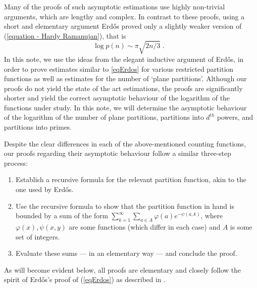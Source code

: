 \documentclass[11pt]{article}
\theoremstyle{plain}
\begin{document}
Many of the proofs of such asymptotic estimations use highly non-trivial arguments, which are lengthy and complex. In contrast to these proofs, using a short and elementary argument Erd\H{o}s \cite{Erdos} proved only a slightly weaker version of (\ref{equation - Hardy Ramanujan}), that is
\begin{equation}\label{eqErdos}
\log p(n) \sim \pi\sqrt{2n/3}\;.
\end{equation}
In this note, we use the ideas from the elegant inductive argument of Erd\H{o}s, in order to prove estimates similar to \eqref{eqErdos} for various restricted partition functions as well as estimates for the number of `plane partitions'.
Although our proofs do not yield the state of the art estimations, the proofs are significantly shorter and yield the correct asymptotic behaviour of the logarithm of the functions under study.
In this note, we will determine the asymptotic behaviour of the logarithm of the number of plane partitions, partitions into $d^{th}$ powers, and partitions into primes.

Despite the clear differences in each of the above-mentioned counting functions, our proofs regarding their asymptotic behaviour follow a similar three-step process:
\begin{enumerate}[label=\textbf{(R\arabic*)}]
    \item\label{R1} Establish a recursive formula for the relevant partition function, akin to the one used by Erd\H{o}s.
    \item\label{R2} Use the recursive formula to show that the partition function in hand is bounded by a sum of the form $\sum_{k=1}^{\infty}\sum_{a\in A} \varphi(a) e^{-\psi(a,k)}$, where $\varphi(x),\psi(x,y)$ are some functions (which differ in each case) and $A$ is some set of integers.
    \item\label{R3} Evaluate these sums --- in an elementary way --- and conclude the proof.
\end{enumerate}
As will become evident below, all proofs are elementary and closely follow the spirit of Erd\H{o}s's proof of (\ref{eqErdos}) as described in \cite{Nathanson}.
\end{document}

